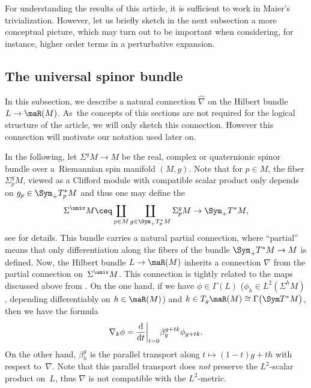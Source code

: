 For understanding the results of this article, it is sufficient to work in Maier's trivialization.
However, let us briefly sketch in the next subsection a more conceptual picture,
which may turn out to be important when considering, for instance,
higher order terms in a perturbative expansion.

\subsection{The universal spinor bundle}

In this subsection, we describe a natural connection $\hat\nabla$ on the Hilbert bundle $L\to \maR(M)$. As~the concepts of this sections are not required for the logical structure of the article, we will only sketch this connection. However this connection will motivate our notation used later on.

In the following, let $\Sigma^g M\to M$ be the real, complex or quaternionic spinor bundle over a~Riemannian spin manifold $(M,g)$.
Note that for $p\in M$, the fiber $\Sigma^g_p M$, viewed as a Clifford module with compatible scalar product only depends on $g_p\in \Sym_+T^*_pM$ and thus one may define the 
\[\Sigma^{\univ} M\ceq\coprod_{p\in M}\coprod_{g\in \Sym_+T^*_pM }\Sigma^g_p M\to \Sym_+ T^*M ,\]
see \cite{ammann.weiss.witt.math.ann:2016,ammann.weiss.witt.math.z:2016,mueller.nowaczyk:2017} for details.
This bundle carries a natural partial connection, where ``partial'' means that only differentiation along the fibers of the bundle $\Sym_+ T^*M\to M$ is defined. Now, the Hilbert bundle $L\to \maR(M)$ inherits a connection $\nabla$ from the partial connection on~$\Sigma^{\univ} M$. This connection is tightly related to the maps  discussed above from \cite{bourguignon.gauduchon:92}.
On the one hand, if we have $\phi\in \Gamma(L)$ \big(\ie $\phi_h\in L^2(\Sigma^h M)$, depending differentiably on $h\in \maR(M)$\big) and ${k\in T_g\maR(M)\cong \Gamma\big(\Sym T^*M\big)}$, then we have the formula
\[
\nabla_k\phi=\frac{{\rm d}}{{\rm d}t}\bigg|_{t=0}\beta^{g+tk}_g\phi_{g+tk} .
\]
On the other hand, $\beta^g_h$ is the parallel transport along $t\mapsto (1-t)g+th$ with respect to~$\nabla$.
Note that this parallel transport does \emph{not} preserve the $L^2$-scalar product on~$L$,
thus $\nabla$ is not compatible with the $L^2$-metric.

